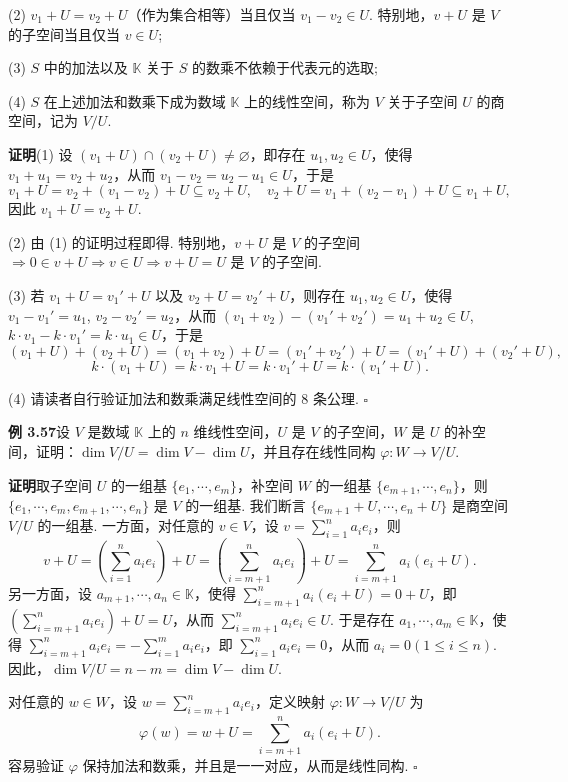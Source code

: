 \documentclass[UTF8,12pt,a4paper,fontset=fandol]{ctexart}
\begin{document}
(2) $v_1+U=v_2+U$（作为集合相等）当且仅当 $v_1-v_2\in U$. 特别地，$v+U$ 是 $V$ 的子空间当且仅当 $v\in U$;

(3) $S$ 中的加法以及 $\mathbb{K}$ 关于 $S$ 的数乘不依赖于代表元的选取;

(4) $S$ 在上述加法和数乘下成为数域 $\mathbb{K}$ 上的线性空间，称为 $V$ 关于子空间 $U$ 的商空间，记为 $V/U$.

\noindent\textbf{证明}\quad (1) 设 $(v_1+U)\cap(v_2+U)\ne\varnothing$，即存在 $u_1,u_2\in U$，使得 $v_1+u_1=v_2+u_2$，从而 $v_1-v_2=u_2-u_1\in U$，于是
\[
v_1+U=v_2+(v_1-v_2)+U\subseteq v_2+U,\quad
v_2+U=v_1+(v_2-v_1)+U\subseteq v_1+U,
\]
因此 $v_1+U=v_2+U$.

(2) 由 (1) 的证明过程即得. 特别地，$v+U$ 是 $V$ 的子空间 $\Rightarrow 0\in v+U\Rightarrow v\in U\Rightarrow v+U=U$ 是 $V$ 的子空间.

(3) 若 $v_1+U=v_1'+U$ 以及 $v_2+U=v_2'+U$，则存在 $u_1,u_2\in U$，使得 $v_1-v_1'=u_1$, $v_2-v_2'=u_2$，从而 $(v_1+v_2)-(v_1'+v_2')=u_1+u_2\in U$, $k\cdot v_1-k\cdot v_1'=k\cdot u_1\in U$，于是
\[
(v_1+U)+(v_2+U)=(v_1+v_2)+U=(v_1'+v_2')+U=(v_1'+U)+(v_2'+U),
\]
\[
k\cdot(v_1+U)=k\cdot v_1+U=k\cdot v_1'+U=k\cdot(v_1'+U).
\]

(4) 请读者自行验证加法和数乘满足线性空间的 8 条公理. $\square$

\noindent\textbf{例 3.57}\quad 设 $V$ 是数域 $\mathbb{K}$ 上的 $n$ 维线性空间，$U$ 是 $V$ 的子空间，$W$ 是 $U$ 的补空间，证明：$\dim V/U=\dim V-\dim U$，并且存在线性同构 $\varphi:W\to V/U$.

\noindent\textbf{证明}\quad 取子空间 $U$ 的一组基 $\{e_1,\cdots,e_m\}$，补空间 $W$ 的一组基 $\{e_{m+1},\cdots,e_n\}$，则 $\{e_1,\cdots,e_m,e_{m+1},\cdots,e_n\}$ 是 $V$ 的一组基. 我们断言 $\{e_{m+1}+U,\cdots,e_n+U\}$ 是商空间 $V/U$ 的一组基. 一方面，对任意的 $v\in V$，设 $v=\sum_{i=1}^n a_ie_i$，则
\[
v+U=\left(\sum_{i=1}^n a_ie_i\right)+U
=\left(\sum_{i=m+1}^n a_ie_i\right)+U
=\sum_{i=m+1}^n a_i(e_i+U).
\]
另一方面，设 $a_{m+1},\cdots,a_n\in\mathbb{K}$，使得 $\sum_{i=m+1}^n a_i(e_i+U)=0+U$，即 $\left(\sum_{i=m+1}^n a_ie_i\right)+U=U$，从而 $\sum_{i=m+1}^n a_ie_i\in U$. 于是存在 $a_1,\cdots,a_m\in\mathbb{K}$，使得 $\sum_{i=m+1}^n a_ie_i=-\sum_{i=1}^m a_ie_i$，即 $\sum_{i=1}^n a_ie_i=0$，从而 $a_i=0(1\le i\le n)$. 因此，$\dim V/U=n-m=\dim V-\dim U$.

对任意的 $w\in W$，设 $w=\sum_{i=m+1}^n a_ie_i$，定义映射 $\varphi:W\to V/U$ 为
\[
\varphi(w)=w+U=\sum_{i=m+1}^n a_i(e_i+U).
\]
容易验证 $\varphi$ 保持加法和数乘，并且是一一对应，从而是线性同构. $\square$
\end{document}
